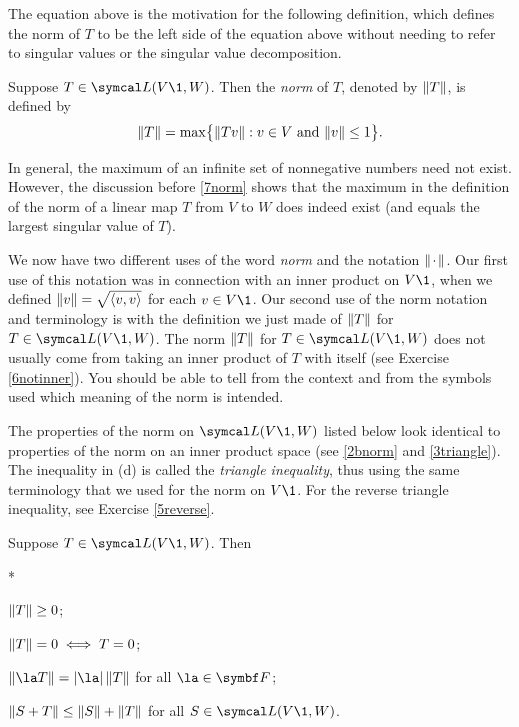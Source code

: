 The equation above is the motivation for the following definition, which defines the norm of $T$ to be the left side of the equation above without needing to refer to singular values or the singular value decomposition.

{Suppose $T \in \L(V\1, W)$. Then the \emph{norm} of $T$, denoted by $\norm{T}$, is defined by
\[
\norm{T} = \max \br[\big]{ \norm{Tv} : v \in V \text{ and } \norm{v} \le 1}.
\]}

\pagebreak[3]

In general, the maximum of an infinite set of nonnegative numbers need not exist. However, the discussion before \ref{7norm} shows that the maximum in the definition of the norm of a linear map $T$ from $V$ to $W$ does indeed exist (and equals the largest singular value of $T$).

We now have two different uses of the word \textit{norm} and the notation $\norm{\Cdot}$. Our first use of this notation was in connection with an inner product on $V\1$, when we defined $\norm{v} = \sqrt{\ip{v,v}}$ for each $v \in V\1$. Our second use of the norm notation and terminology is with the definition we just made of $\norm{T}$ for $T \in \L(V\1,W)$. The norm $\norm{T}$ for $T \in \L(V\1,W)$ does not usually come from taking an inner product of $T$ with itself (see Exercise \ref{6notinner}). You should be able to tell from the context and from the symbols used which meaning of the norm is intended.

The properties of the norm on $\L(V\1, W)$ listed below look identical to properties of the norm on an inner product space (see \ref{2bnorm} and \ref{3triangle}). The inequality in (d) is called the \emph{triangle inequality}, thus using the same terminology that we used for the norm on $V\1$. For the reverse triangle inequality, see Exercise \ref{5reverse}.

{Suppose $T \in \L(V\1, W)$. Then
\begin{subtheorem}*
\item
$\norm{T} \ge 0$;
\item
$\norm{T} = 0 \iff T = 0$;
\item
$\norm{\la T} = \abs{\la} \, \norm{T}$ for all $\la \in \F{}$;
\item
$\norm{S + T} \le \norm{S} + \norm{T}$ for all $S \in \L(V\1, W)$.
\end{subtheorem}}

